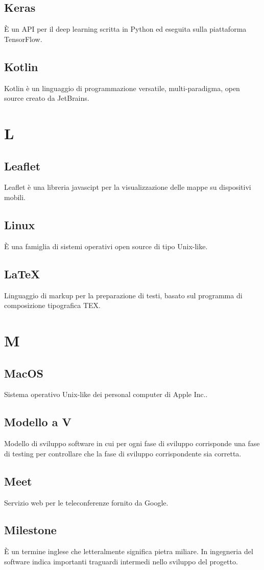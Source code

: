 \subsection{Keras} È un API per il deep learning scritta in Python ed eseguita sulla piattaforma TensorFlow.
\subsection{Kotlin} Kotlin è un linguaggio di programmazione versatile, multi-paradigma, open source creato da JetBrains.
\newpage \section{L}
\subsection{Leaflet} Leaflet è una libreria javascipt per la visualizzazione delle mappe su dispositivi mobili.
\subsection{Linux} È una famiglia di sistemi operativi open source di tipo Unix-like.
\subsection{\LaTeX} Linguaggio di markup per la preparazione di testi, basato sul programma di composizione tipografica TEX.
\newpage \section{M}
\subsection{MacOS} Sistema operativo Unix-like dei personal computer di Apple Inc..
\subsection{Modello a V} Modello di sviluppo software in cui per ogni fase di sviluppo corrisponde una fase di testing per controllare che la fase di sviluppo corrispondente sia corretta.
\subsection{Meet} Servizio web per le teleconferenze fornito da Google.
\subsection{Milestone} È un termine inglese che letteralmente significa pietra miliare. In ingegneria del software indica importanti traguardi intermedi nello sviluppo del progetto.
